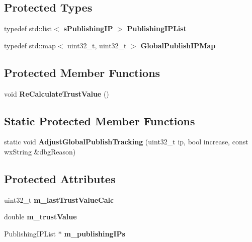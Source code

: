 \subsection*{Protected Types}
\begin{DoxyCompactItemize}
\item 
typedef std::list$<$ {\bf sPublishingIP} $>$ {\bfseries PublishingIPList}\label{classKademlia_1_1CKeyEntry_ade53e3d7636fc00b1e75e2f16de98703}

\item 
typedef std::map$<$ uint32\_\-t, uint32\_\-t $>$ {\bfseries GlobalPublishIPMap}\label{classKademlia_1_1CKeyEntry_acafc1a760af407d805139e679a011500}

\end{DoxyCompactItemize}
\subsection*{Protected Member Functions}
\begin{DoxyCompactItemize}
\item 
void {\bfseries ReCalculateTrustValue} ()\label{classKademlia_1_1CKeyEntry_a29c9b2e9dc3f7d5c3ba9008a2cc2f51d}

\end{DoxyCompactItemize}
\subsection*{Static Protected Member Functions}
\begin{DoxyCompactItemize}
\item 
static void {\bfseries AdjustGlobalPublishTracking} (uint32\_\-t ip, bool increase, const wxString \&dbgReason)\label{classKademlia_1_1CKeyEntry_ab85b0732f3001a7507f93c243f9382a1}

\end{DoxyCompactItemize}
\subsection*{Protected Attributes}
\begin{DoxyCompactItemize}
\item 
uint32\_\-t {\bfseries m\_\-lastTrustValueCalc}\label{classKademlia_1_1CKeyEntry_a43f48f827d43ef9cb45953b884d4ffed}

\item 
double {\bfseries m\_\-trustValue}\label{classKademlia_1_1CKeyEntry_ae665dd64ec6bfd091e9b6dfdd5bcfcca}

\item 
PublishingIPList $\ast$ {\bfseries m\_\-publishingIPs}\label{classKademlia_1_1CKeyEntry_ae413aa6a744d003b3e07a667943ccbc0}

\end{DoxyCompactItemize}

